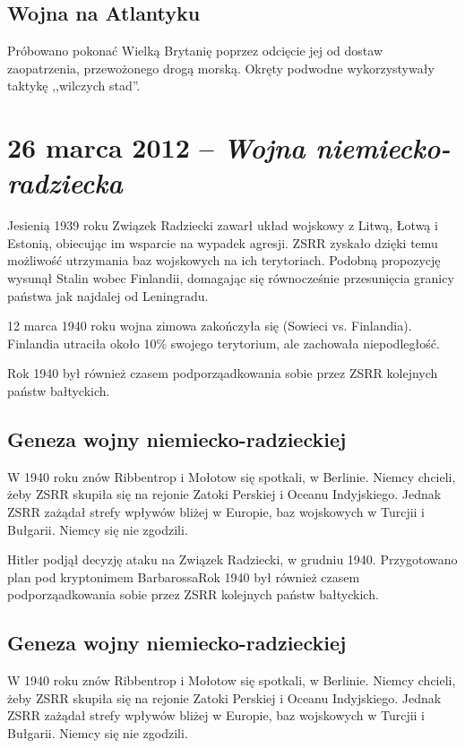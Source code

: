 \documentclass [a4paper, 11pt, oneside]{book}
\begin{document}
\section{Wojna na Atlantyku}

Próbowano pokonać Wielką Brytanię poprzez odcięcie jej od dostaw zaopatrzenia, przewożonego drogą morską. Okręty podwodne wykorzystywały taktykę ,,wilczych stad''.

\chapter{26 marca 2012 -- \textit{Wojna niemiecko-radziecka}}

Jesienią 1939 roku Związek Radziecki zawarł układ wojskowy z Litwą, Łotwą i Estonią, obiecując im wsparcie na wypadek agresji. ZSRR zyskało dzięki temu możliwość utrzymania baz wojskowych na ich terytoriach. Podobną propozycję wysunął Stalin wobec Finlandii, domagając się równocześnie przesunięcia granicy państwa jak najdalej od Leningradu.

12 marca 1940 roku wojna zimowa zakończyła się (Sowieci vs. Finlandia). Finlandia utraciła około 10\% swojego terytorium, ale zachowała niepodległość.

Rok 1940 był również czasem podporząadkowania sobie przez ZSRR kolejnych państw bałtyckich.

\section{Geneza wojny niemiecko-radzieckiej}

W 1940 roku znów Ribbentrop i Mołotow się spotkali, w Berlinie. Niemcy chcieli, żeby ZSRR skupiła się na rejonie Zatoki Perskiej i Oceanu Indyjskiego. Jednak ZSRR zażądał strefy wpływów bliżej w Europie, baz wojskowych w Turcjii i Bułgarii. Niemcy się nie zgodzili.

Hitler podjął decyzję ataku na Związek Radziecki, w grudniu 1940. Przygotowano plan pod kryptonimem BarbarossaRok 1940 był również czasem podporząadkowania sobie przez ZSRR kolejnych państw bałtyckich.

\section{Geneza wojny niemiecko-radzieckiej}

W 1940 roku znów Ribbentrop i Mołotow się spotkali, w Berlinie. Niemcy chcieli, żeby ZSRR skupiła się na rejonie Zatoki Perskiej i Oceanu Indyjskiego. Jednak ZSRR zażądał strefy wpływów bliżej w Europie, baz wojskowych w Turcjii i Bułgarii. Niemcy się nie zgodzili.
\end{document}
